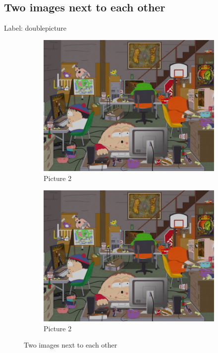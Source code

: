 \subsection{Two images next to each other}
Label: doublepicture
\begin{figure}[H]
    \centering
    \begin{subfigure}[b]{0.48\linewidth}        %
        \centering
        \includegraphics[width=\linewidth]{Pictures/southpark4.jpg}
        \caption{Picture 2}
        \label{fig:southpark4_1}
    \end{subfigure}
    \begin{subfigure}[b]{0.48\linewidth}        %
        \centering
        \includegraphics[width=\linewidth]{Pictures/southpark4.jpg}
        \caption{Picture 2}
        \label{fig:southpark4_2}
    \end{subfigure}
    \caption{Two images next to each other}
    \label{fig:doublepicture}
\end{figure}


